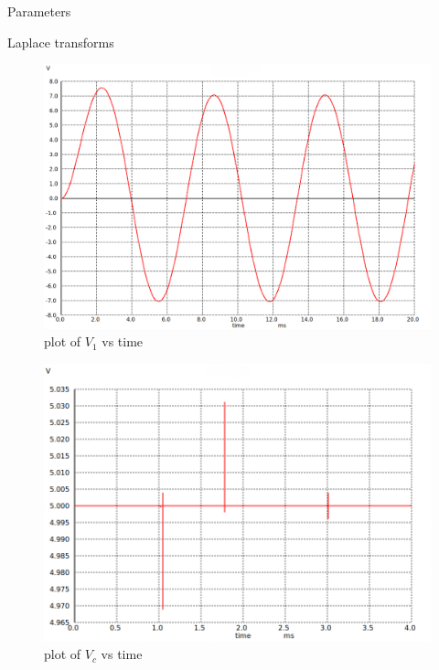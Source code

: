 \documentclass[journal,12pt,twocolumn]{IEEEtran}
\begin{document}
\begin{table}[ht]
    \begin{adjustbox}{width=\columnwidth}
       
    \end{adjustbox}
    \caption{Parameters}
    \label{tab:Gate.ee.54.1}

\end{table}


\begin{table}[ht]
    
    \caption{Laplace transforms}
    \label{tab:Gate.ee.54.2}
\end{table}

\begin{figure}[htbp]
    \centering
    \includegraphics[width=\columnwidth]{figs/fig1.png}
    \caption{plot of $V_1$ vs time}
\end{figure}

\begin{figure}[htbp]
    \centering
    \includegraphics[width=\columnwidth]{figs/fig2.png}
    \caption{plot of $V_c$ vs time}
\end{figure}
\end{document}

